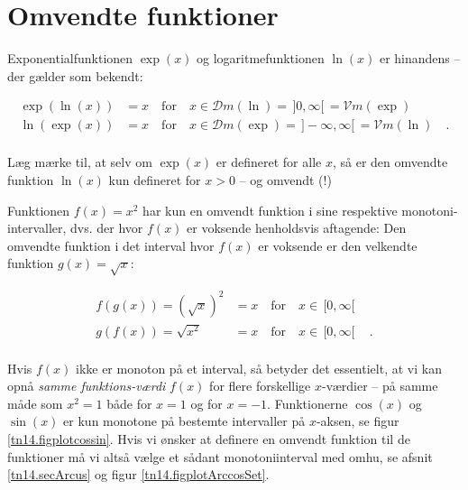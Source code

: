 

\section{Omvendte funktioner} \label{tn14.secOmvendtFunk}

Exponentialfunktionen $\exp(x)$ og logaritmefunktionen $\ln(x)$ er hinandens  -- der gælder som bekendt:

\begin{equation}
\begin{aligned}
\exp(\ln(x)) &= x \quad \textrm{for} \quad x \in \mathcal{D}m(\ln) = \, ]0, \infty[ \,= \mathcal{V}m(\exp)\\
\ln(\exp(x)) & = x \quad \textrm{for} \quad x \in \mathcal{D}m(\exp) =\, ]-\infty, \infty[\, = \mathcal{V}m(\ln) \quad .\\
\end{aligned}
\end{equation}

\begin{think}
Læg mærke til, at selv om $\exp(x)$ er defineret for alle $x$, så er den omvendte funktion $\ln(x)$ kun defineret for $x > 0$ -- og omvendt (!)
\end{think}

Funktionen $f(x) = x^{2}$ har kun en omvendt funktion i sine respektive monotoni-intervaller, dvs. der hvor $f(x)$ er voksende henholdsvis aftagende:
Den omvendte funktion i det interval hvor $f(x)$ er voksende er den velkendte funktion $g(x) = \sqrt{x}$:

\begin{equation}
\begin{aligned}
f(g(x))= (\sqrt{x})^{2} &= x \quad \textrm{for} \quad x \in \, [0, \infty[ \\
g(f(x)) = \sqrt{x^{2}} & = x \quad \textrm{for} \quad x \in \, [0, \infty[\,  \quad .\\
\end{aligned}
\end{equation}

\begin{think}
Hvis $f(x)$ ikke er monoton på et interval, så betyder det essentielt, at vi kan opnå \emph{samme funktions-værdi} $f(x)$ for flere forskellige $x$-værdier -- på samme måde som $x^{2}= 1$ både for $x=1$ og for $x=-1$.
Funktionerne $\cos(x)$ og $\sin(x)$ er kun monotone på bestemte intervaller på $x$-aksen, se figur \ref{tn14.figplotcossin}.
Hvis vi ønsker at definere en omvendt funktion til de funktioner må vi altså vælge et sådant monotoniinterval med omhu, se afsnit \ref{tn14.secArcus} og figur \ref{tn14.figplotArccosSet}.
\end{think}


